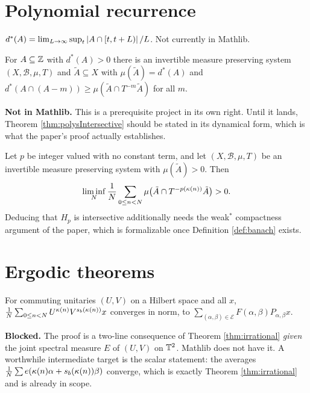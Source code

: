 \chapter{Polynomial recurrence}
\label{chap:recurrence}

\begin{definition}
  \label{def:banach}
  \notready
  $d^*(A) = \lim_{L \to \infty} \sup_{t} \left\lvert A \cap [t, t+L) \right\rvert/L$.
  Not currently in Mathlib.
\end{definition}

\begin{theorem}
  \label{thm:furstenberg}
  \notready
  For $A \subseteq \mathbb{Z}$ with $d^*(A) > 0$ there is an invertible measure
  preserving system $(X, \mathcal{B}, \mu, T)$ and $\tilde A \subseteq X$ with
  $\mu(\tilde A) = d^*(A)$ and
  $d^*(A \cap (A-m)) \geq \mu(\tilde A \cap T^{-m}\tilde A)$ for all $m$.

  \textbf{Not in Mathlib.} This is a prerequisite project in its own right.
  Until it lands, Theorem \ref{thm:polysIntersective} should be stated in its
  dynamical form, which is what the paper's proof actually establishes.
\end{theorem}

\begin{theorem}
  \label{thm:polysIntersective}
  \notready
  Let $p$ be integer valued with no constant term, and let
  $(X,\mathcal{B},\mu,T)$ be an invertible measure preserving system with
  $\mu(\tilde A) > 0$. Then
  \[
    \liminf_N \frac1N \sum_{0 \leq n < N}
      \mu\bigl(\tilde A \cap T^{-p(\kappa(n))}\tilde A\bigr) > 0 .
  \]
  Deducing that $H_p$ is intersective additionally needs the weak$^*$
  compactness argument of the paper, which is formalizable once
  Definition \ref{def:banach} exists.
\end{theorem}

\chapter{Ergodic theorems}
\label{chap:ergodic}

\begin{theorem}[Theorem 6.1]
  \label{thm:ergodic}
  \notready
  For commuting unitaries $(U,V)$ on a Hilbert space and all $x$,
  $\frac1N\sum_{0 \leq n < N} U^{\kappa(n)}V^{s_b(\kappa(n))}x$ converges in
  norm, to $\sum_{(\alpha,\beta) \in \mathcal{E}} F(\alpha,\beta)
  P_{\alpha,\beta}x$.

  \textbf{Blocked.} The proof is a two-line consequence of Theorem
  \ref{thm:irrational} \emph{given} the joint spectral measure $E$ of
  $(U,V)$ on $\mathbb{T}^2$. Mathlib does not have it. A worthwhile intermediate
  target is the scalar statement: the averages
  $\frac1N\sum e(\kappa(n)\alpha + s_b(\kappa(n))\beta)$ converge, which is
  exactly Theorem \ref{thm:irrational} and is already in scope.
\end{theorem}

